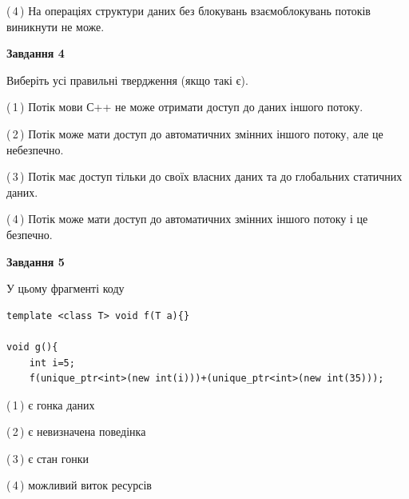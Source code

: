 \documentclass[12pt, ukrainian]{article}
\begin{document}
\begin {large}
{(\,4\,) На операціях структури даних без блокувань взаємоблокувань потоків виникнути не може.%



\begin{center}
\textbf{Завдання 4}
\end{center}
Виберіть усі правильні твердження (якщо такі є).\par
\vspace{2mm}

(\,1\,) Потік мови С++ не може отримати доступ до даних іншого потоку.%

(\,2\,) Потік може мати доступ до автоматичних змінних іншого потоку, але це небезпечно.%

(\,3\,) Потік має доступ тільки до своїх власних даних та до глобальних статичних даних.%

(\,4\,) Потік може мати доступ до автоматичних змінних іншого потоку і це безпечно.%



\begin{center}
\textbf{Завдання 5}
\end{center}
У цьому фрагменті коду
\begin{verbatim}
template <class T> void f(T a){}

void g(){
    int i=5;
    f(unique_ptr<int>(new int(i)))+(unique_ptr<int>(new int(35)));
\end{verbatim}
(\,1\,) є гонка даних%

(\,2\,) є невизначена поведінка%

(\,3\,) є стан гонки%

(\,4\,) можливий виток ресурсів%


}
\end {large}
\end{document}
